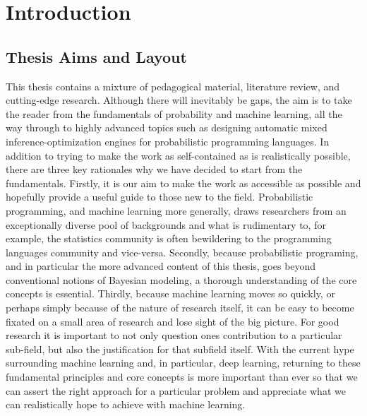 
\chapter{Introduction}
\label{chp:intro}



\section{Thesis Aims and Layout}

This thesis contains a mixture of pedagogical material, literature review, and 
cutting-edge research.
Although there will inevitably be gaps, the aim is to take
the reader from the fundamentals of probability and machine learning,
all the way through to highly advanced topics such as designing automatic
mixed inference-optimization engines for probabilistic programming languages.
In addition to trying to make the work as self-contained as is realistically possible, there are
three key rationales why we have decided to start from the fundamentals.  Firstly, it is our aim to make the work 
as accessible as possible and hopefully provide a useful guide to those new to the field.
Probabilistic programming, and machine learning more generally, draws
researchers from an exceptionally diverse pool of backgrounds and what is rudimentary
to, for example, the statistics community is often bewildering to the programming
languages community and vice-versa. Secondly, because probabilistic programing, and 
in particular the more advanced content of this thesis, goes beyond conventional notions of
Bayesian modeling, a thorough understanding of the core concepts is essential.
Thirdly, because machine learning moves so quickly, or perhaps simply because
of the nature of research itself, it can be easy to become fixated on a small area of
research and lose sight of the big picture.  For good research it is important to not
only question ones contribution to a particular sub-field, but also the justification for
that subfield itself.  With the current hype surrounding machine learning and, in particular,
deep learning, returning to these
fundamental principles and core concepts is more important than ever so that we can assert 
 the right approach for a particular problem and  appreciate what we can realistically
hope to achieve with machine learning.

